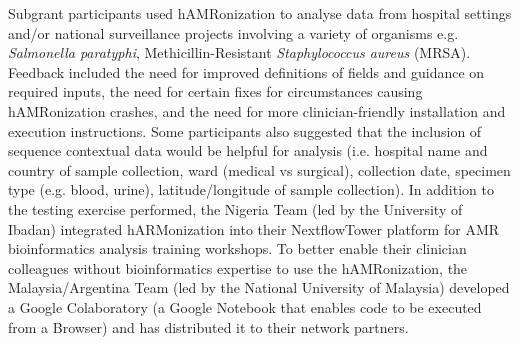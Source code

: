 Subgrant participants used hAMRonization to analyse data from hospital settings and/or national surveillance projects involving a variety of organisms e.g. \textit{Salmonella paratyphi}, Methicillin-Resistant \textit{Staphylococcus aureus} (MRSA). Feedback included the need for improved definitions of fields and guidance on required inputs, the need for certain fixes for circumstances causing hAMRonization crashes, and the need for more clinician-friendly installation and execution instructions. Some participants also suggested that the inclusion of sequence contextual data would be helpful for analysis (i.e. hospital name and country of sample collection, ward (medical vs surgical), collection date, specimen type (e.g. blood, urine), latitude/longitude of sample collection). In addition to the testing exercise performed, the Nigeria Team (led by the University of Ibadan) integrated hARMonization into their NextflowTower platform for AMR bioinformatics analysis training workshops. To better enable their clinician colleagues without bioinformatics expertise to use the hAMRonization, the Malaysia/Argentina Team (led by the National University of Malaysia) developed a Google Colaboratory (a Google Notebook that enables code to be executed from a Browser) and has distributed it to their network partners.


